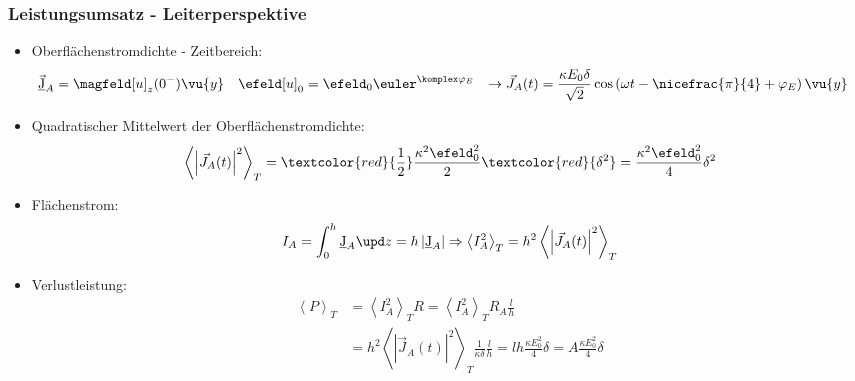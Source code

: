 \begin{frame}
   \frametitle{Leistungsumsatz - Leiterperspektive}
\begin{itemize}[<+->]
\item Oberflächenstromdichte - Zeitbereich:
  \begin{align*}
    \vec{\underbar{J}}_A & =\magfeld[u]_z(0^-) \vu{y} \quad \efeld[u]_{0} = \efeld_{0} \euler^{\komplex\varphi_E}  & \to \vec{J}_A(t) & = \frac{\kappa E_0 \delta}{\sqrt{2}}  \cos\left( \omega t -\nicefrac{\pi}{4} +\varphi_E \right) \vu{y}
  \end{align*}
\item Quadratischer Mittelwert der Oberflächenstromdichte:
  $$\left\langle \left| \vec{J}_A(t) \right|^2  \right\rangle_T  = \textcolor{red}{\frac{1}{2}} \frac{\kappa^2\efeld_0^2}{2} \textcolor{red}{\delta^2} = \frac{\kappa^2\efeld_0^2}{4} \delta^2 
  $$
\item Flächenstrom:
  $$
  I_A=\int_0^h \underbar{J}_A  \upd z = h \left|\underbar{J}_A\right| \Rightarrow \left\langle I_A^2 \right\rangle_T = h^2 \left\langle \left| \vec{J}_A(t) \right|^2  \right\rangle_T  
  $$
\item Verlustleistung:
  \begin{align*}
    \left\langle P\right\rangle_T &= \left\langle I_A^2 \right\rangle_T R = \left\langle I_A^2 \right\rangle_T R_A \frac{l}{h} \\
    &= h^2 \left\langle \left| \vec{J}_A(t) \right|^2  \right\rangle_T \frac{1}{\kappa\delta} \frac{l}{h} = l h \frac{\kappa E_0^2}{4} \delta = A \frac{\kappa E_0^2}{4} \delta
    \end{align*}
 \end{itemize}
\end{frame}

